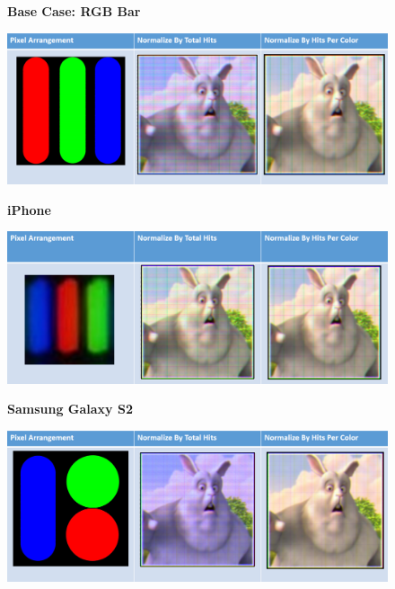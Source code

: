 \begin{figure}
    \centering
    \textbf{Base Case: RGB Bar}\par\medskip
    \includegraphics[width=6in]{chapters/chapter7/images/RGB_Bar.png}
\end{figure}

\begin{figure}
    \centering
    \textbf{iPhone}\par\medskip
    \includegraphics[width=6in]{chapters/chapter7/images/iPhone.png}
\end{figure}

\begin{figure}
    \centering
    \textbf{Samsung Galaxy S2}\par\medskip
    \includegraphics[width=6in]{chapters/chapter7/images/Samsung_Galaxy_S2.png}
\end{figure}

